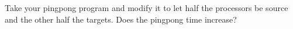   \label{ex:hbwpingpong}
  Take your pingpong program and modify it
  to let half the processors
  be source and the other half the targets. Does the pingpong time increase?
